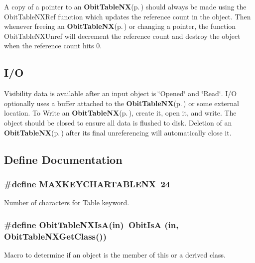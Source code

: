 A copy of a pointer to an {\bf Obit\-Table\-NX}{\rm (p.\,\pageref{structObitTableNX})} should always be made using the Obit\-Table\-NXRef function which updates the reference count in the object. Then whenever freeing an {\bf Obit\-Table\-NX}{\rm (p.\,\pageref{structObitTableNX})} or changing a pointer, the function Obit\-Table\-NXUnref will decrement the reference count and destroy the object when the reference count hits 0.\subsection{I/O}\label{ObitTableNX_8h_ObitTableNXUsage}
Visibility data is available after an input object is \char`\"{}Opened\char`\"{} and \char`\"{}Read\char`\"{}. I/O optionally uses a buffer attached to the {\bf Obit\-Table\-NX}{\rm (p.\,\pageref{structObitTableNX})} or some external location. To Write an {\bf Obit\-Table\-NX}{\rm (p.\,\pageref{structObitTableNX})}, create it, open it, and write. The object should be closed to ensure all data is flushed to disk. Deletion of an {\bf Obit\-Table\-NX}{\rm (p.\,\pageref{structObitTableNX})} after its final unreferencing will automatically close it.

\subsection{Define Documentation}
\subsubsection{\setlength{\rightskip}{0pt plus 5cm}\#define MAXKEYCHARTABLENX\ 24}\label{ObitTableNX_8h_a0}


Number of characters for Table keyword. 

\subsubsection{\setlength{\rightskip}{0pt plus 5cm}\#define Obit\-Table\-NXIs\-A(in)\ Obit\-Is\-A (in, Obit\-Table\-NXGet\-Class())}\label{ObitTableNX_8h_a3}


Macro to determine if an object is the member of this or a derived class. 

